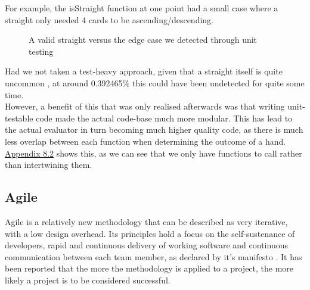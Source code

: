 \documentclass[11pt]{article}
\begin{document}
For example, the isStraight function at one point had a small case where a straight only needed 4 cards to be ascending/descending. \\

\begin{figure}[h]
	\caption{A valid straight versus the edge case we detected through unit testing}
\end{figure}

Had we not taken a test-heavy approach, given that a straight itself is quite uncommon \cite{str_uncommon}, at around 0.392465\% this could have been undetected for quite some time. \\

However, a benefit of this that was only realised afterwards was that writing unit-testable code made the actual code-base much more modular. This has lead to the actual evaluator in turn becoming much higher quality code, as there is much less overlap between each function when determining the outcome of a hand.  \hyperlink{app_eval}{Appendix 8.2} shows this, as we can see that we only have functions to call rather than intertwining them. 


\newpage
\subsection{Agile}

Agile is a relatively new methodology that can be described as very iterative, with a low design overhead. Its principles hold a focus on the self-sustenance of developers, rapid and continuous delivery of working software and continuous communication between each team member, as declared by it's manifesto \cite{agile_principles}. It has been reported that the more the methodology is applied to a project, the more likely a project is to be considered successful. \cite{agile_success} \\ %
\end{document}

